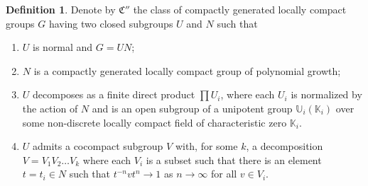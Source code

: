 \documentclass[11pt,leqno]{article}
\theoremstyle{plain}
\theoremstyle{definition}
\newtheorem{definition}[theorem]{Definition}
\theoremstyle{remark}
\numberwithin{equation}{section}
\newcommand{\K}{\mathbb{K}}
\begin{document}
\begin{definition}\cite{CT}
Denote by $\mathfrak{C}''$ the class of compactly generated locally compact groups $G$ having
 two closed subgroups $U$ and $N$ such that
\begin{enumerate}
\item $U$ is normal and $G=UN$;
\item\label{ssg0} $N$ is a compactly generated locally compact group of polynomial growth;
\item\label{ssg1} $U$ decomposes as a finite direct product $\prod U_i$, where each $U_i$ is normalized by the action of $N$ and is an open subgroup of a unipotent group $\mathbb{U}_i(\mathbb K_i)$ over some non-discrete locally compact field of characteristic zero $\K_i$. 
\item\label{ssg3} $U$ admits a cocompact subgroup $V$ with, for some $k$, a decomposition $V=V_1V_2\ldots V_k$ where each $V_i$ is a subset such that there is an element $t=t_i\in N$ such that $t^{-n}vt^n\to 1$ as $n\to \infty$ for all $v\in V_i$.
\end{enumerate}
\end{definition}
\end{document}
